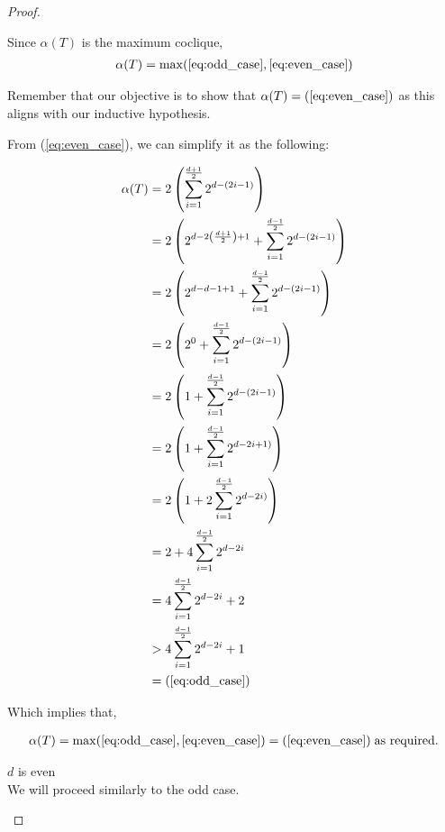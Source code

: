 \documentclass{article}
\theoremstyle{definition}
\begin{document}
\begin{proof}
\begin{caseof}
\begin{subcaseof}
		\end{subcaseof}

		Since $\alpha(T)$ is the maximum coclique,
		\begin{align*}
			\alpha(T) = \max(\ref{eq:odd_case}, \ref{eq:even_case})
		\end{align*}

		Remember that our objective is to show that $\alpha(T) = (\ref{eq:even_case})$ as this aligns with our inductive hypothesis.

		From (\ref{eq:even_case}), we can simplify it as the following:

		\begin{align*}
			\alpha(T) & = 2\left(\displaystyle\sum_{i = 1}^{\frac{d + 1}{2}}2^{d - (2i - 1)}\right)  \\
				  & = 2\left(2^{d - 2\left(\frac{d + 1}{2}\right) + 1} + \displaystyle\sum_{i = 1}^{\frac{d - 1}{2}}2^{d - (2i - 1)}\right)\\
				  & = 2\left(2^{d - d - 1 + 1} + \displaystyle\sum_{i = 1}^{\frac{d - 1}{2}}2^{d - (2i - 1)}\right)\\
				  & = 2\left(2^0 + \displaystyle\sum_{i = 1}^{\frac{d - 1}{2}}2^{d - (2i - 1)}\right)\\
				  & = 2\left(1 + \displaystyle\sum_{i = 1}^{\frac{d - 1}{2}}2^{d - (2i - 1)}\right)\\
				  & = 2\left(1 + \displaystyle\sum_{i = 1}^{\frac{d - 1}{2}}2^{d - 2i + 1)}\right)\\
				  & = 2\left(1 + 2\displaystyle\sum_{i = 1}^{\frac{d - 1}{2}}2^{d - 2i)}\right)\\
				  & = 2 + 4\displaystyle\sum_{i = 1}^{\frac{d - 1}{2}}2^{d - 2i}\\
				  & = 4\displaystyle\sum_{i = 1}^{\frac{d - 1}{2}}2^{d - 2i} + 2 \\
				  & > 4\displaystyle\sum_{i = 1}^{\frac{d - 1}{2}}2^{d - 2i} + 1 \\
				  & = (\ref{eq:odd_case})
		\end{align*}

		Which implies that,

		\begin{align*}
			\alpha(T) = \max(\ref{eq:odd_case}, \ref{eq:even_case}) = (\ref{eq:even_case})\; \text{as required.}
		\end{align*}

	\item $d$ is even \\

		We will proceed similarly to the odd case.


\end{caseof}
\end{proof}
\end{document}
